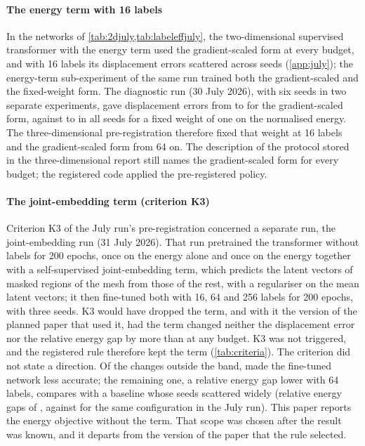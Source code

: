 \paragraph{The energy term with 16 labels}
In the networks of \cref{tab:2djuly,tab:labeleffjuly}, the two-dimensional supervised
transformer with the energy term used the gradient-scaled form at every budget, and with 16
labels its displacement errors scattered across seeds (\ref{app:july}); the energy-term
sub-experiment of the same run trained both the gradient-scaled and the fixed-weight form.
The diagnostic run (30 July 2026), with six seeds in two separate experiments, gave
displacement errors from \numDiagScaledMin{} to \numDiagScaledMax{} for the gradient-scaled
form, against \numDiagFixedMin{} to \numDiagFixedMax{} in all \numDiagFixedSeeds{} seeds for
a fixed weight of one on the normalised energy. The three-dimensional pre-registration
therefore fixed that weight at 16 labels and the gradient-scaled form from 64 on. The
description of the protocol stored in the three-dimensional report still names the
gradient-scaled form for every budget; the registered code applied the pre-registered
policy.

\paragraph{The joint-embedding term (criterion K3)}
Criterion K3 of the July run's pre-registration concerned a separate run, the
joint-embedding run (31 July 2026). That run pretrained the transformer without labels for
200 epochs, once on the energy alone and once on the energy together with a self-supervised
joint-embedding term, which predicts the latent vectors of masked regions of the mesh from
those of the rest, with a regulariser on the mean latent vectors; it then fine-tuned both
with 16, 64 and 256 labels for 200 epochs, with three seeds. K3 would have dropped the term,
and with it the version of the planned paper that used it, had the term changed neither the
displacement error nor the relative energy gap by more than \numKthreeBand{} at any budget.
K3 was not triggered, and the registered rule therefore kept the term (\cref{tab:criteria}).
The criterion did not state a direction. Of the \numKthreeOutside{} changes outside the
band, \numKthreeWorse{} made the fine-tuned network less accurate; the remaining one, a
relative energy gap \numKthreeGain{} lower with 64 labels, compares with a baseline whose
seeds scattered widely (relative energy gaps of \numKthreeBaseSeeds{}, against
\numKthreeBaseRef{} for the same configuration in the July run). This paper reports the
energy objective without the term. That scope was chosen after the result was known, and it
departs from the version of the paper that the rule selected.

